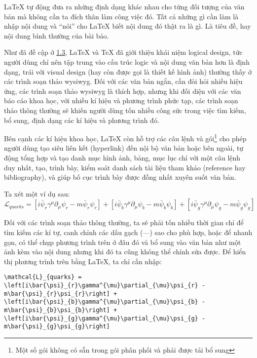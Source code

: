 LaTeX tự động đưa ra những định dạng khác nhau cho từng đối tượng của văn bản mà không cần ta đích
thân làm công việc đó. Tất cả những gì cần làm là nhập nội dung và “nói” cho LaTeX biết nội dung
đó thật ra là gì. Là tiêu đề, hay nội dung bình thường của bài báo.\par
Như đã đề cập ở \hyperlink{logic}{1.3}, LaTeX và TeX đã giới thiệu khái niệm logical design, tức người dùng
chỉ nên tập trung vào cấu trúc logic và nội dung văn bản hơn là định dạng, trái với visual design
(hay còn được gọi là thiết kế hình ảnh) thường thấy ở các trình soạn thảo \acrshort{wysiwyg}. Đối với các văn bản 
ngắn, cần đòi hỏi nhiều hiệu ứng, các trình soạn thảo \acrshort{wysiwyg} là thích hợp, nhưng khi
đối diện với các văn báo cáo khoa học, với nhiều kí hiệu và phương trình phức tạp, các trình soạn
thảo thông thường sẽ khiến người dùng tốn nhiều công sức trong việc tìm kiếm, bổ sung, định dạng
các kí hiệu và phương trình đó.\par 
Bên cạnh các kí hiệu khoa học, LaTeX còn hỗ trợ các câu lệnh và gói\footnote{Một số gói không có sẵn trong gói phân phối và phải được tải bổ sung} cho phép người dùng tạo 
siêu liên kết (hyperlink) đến nội bộ văn bản hoặc bên ngoài, tự động tổng hợp và tạo danh mục hình ảnh, bảng, mục lục
chỉ với một câu lệnh duy nhất, tạo, trình bày, kiểm soát danh sách tài liệu tham khảo (reference hay
bibliography), và giúp bố cục trình bày được đồng nhất xuyên suốt văn bản.\par 
Ta xét một ví dụ sau:
\begin{equation*}
 \mathcal{L}_{quarks} = \left[i\bar{\psi}_{r}\gamma^{\mu}\partial_{\mu}\psi_{r} - m\bar{\psi}_{r}\psi_{r}\right] + \left[i\bar{\psi}_{b}\gamma^{\mu}\partial_{\mu}\psi_{b} - m\bar{\psi}_{b}\psi_{b}\right] + \left[i\bar{\psi}_{g}\gamma^{\mu}\partial_{\mu}\psi_{g} - m\bar{\psi}_{g}\psi_{g}\right]
\end{equation*}

Đối với các trình soạn thảo thông thường, ta sẽ phải tốn nhiều thời gian chỉ để tìm kiếm các kí tự,
canh chỉnh các dấu gạch (---) sao cho phù hợp, hoặc để nhanh gọn, có thể chụp phương trình trên ở đâu
đó và bổ sung vào văn bản như một ảnh kèm vào nội dung nhưng khi đó ta cũng không thể chỉnh sửa được.
Để hiển thị phương trình trên bằng LaTeX, ta chỉ cần nhập:\par
\begin{lstlisting}[numbers=none]
 \mathcal{L}_{quarks} = \left[i\bar{\psi}_{r}\gamma^{\mu}\partial_{\mu}\psi_{r} - m\bar{\psi}_{r}\psi_{r}\right] + \left[i\bar{\psi}_{b}\gamma^{\mu}\partial_{\mu}\psi_{b} - m\bar{\psi}_{b}\psi_{b}\right] + \left[i\bar{\psi}_{g}\gamma^{\mu}\partial_{\mu}\psi_{g} - m\bar{\psi}_{g}\psi_{g}\right]
\end{lstlisting}

